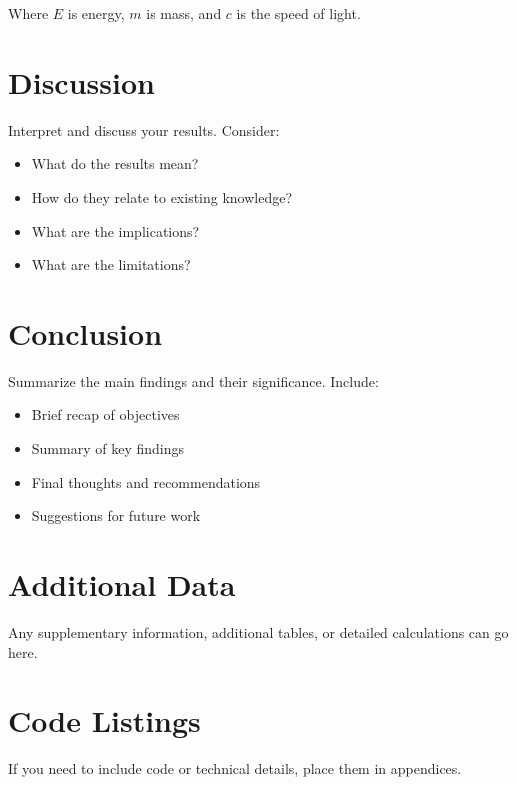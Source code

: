 \documentclass[12pt, a4paper]{article}
\begin{document}
Where $E$ is energy, $m$ is mass, and $c$ is the speed of light.

\section{Discussion}
\label{sec:discussion}

Interpret and discuss your results. Consider:
\begin{itemize}
    \item What do the results mean?
    \item How do they relate to existing knowledge?
    \item What are the implications?
    \item What are the limitations?
\end{itemize}

\section{Conclusion}
\label{sec:conclusion}

Summarize the main findings and their significance. Include:
\begin{itemize}
    \item Brief recap of objectives
    \item Summary of key findings
    \item Final thoughts and recommendations
    \item Suggestions for future work
\end{itemize}


\newpage
\printbibliography[heading=bibintoc, title={References}]


\newpage
\appendix

\section{Additional Data}
\label{app:additional-data}

Any supplementary information, additional tables, or detailed calculations can go here.

\section{Code Listings}
\label{app:code}

If you need to include code or technical details, place them in appendices.
\end{document}
